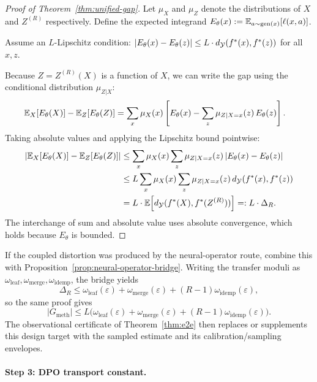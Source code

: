 \begin{proof}[Proof of Theorem~\ref{thm:unified-gap}]
Let $\mu_X$ and $\mu_Z$ denote the distributions of $X$ and $Z^{(R)}$ respectively. Define the expected integrand $E_\theta(x) := \mathbb{E}_{a \sim \mathrm{gen}(x)}[\ell(x, a)]$.

Assume an $L$-Lipschitz condition: $|E_\theta(x) - E_\theta(z)| \le L \cdot d_{\mathcal{Y}}(f^\ast(x), f^\ast(z))$ for all $x, z$.

Because $Z = Z^{(R)}(X)$ is a function of $X$, we can write the gap using the conditional distribution $\mu_{Z|X}$:
\begin{align*}
\mathbb{E}_X[E_\theta(X)] - \mathbb{E}_Z[E_\theta(Z)]
&= \sum_x \mu_X(x) \left[ E_\theta(x) - \sum_z \mu_{Z|X=x}(z)\, E_\theta(z) \right].
\end{align*}
Taking absolute values and applying the Lipschitz bound pointwise:
\begin{align*}
\left|\mathbb{E}_X[E_\theta(X)] - \mathbb{E}_Z[E_\theta(Z)]\right|
&\le \sum_x \mu_X(x) \sum_z \mu_{Z|X=x}(z)\, |E_\theta(x) - E_\theta(z)| \\
&\le L \sum_x \mu_X(x) \sum_z \mu_{Z|X=x}(z)\, d_{\mathcal{Y}}(f^\ast(x), f^\ast(z)) \\
&= L \cdot \mathbb{E}\!\left[d_{\mathcal{Y}}(f^\ast(X), f^\ast(Z^{(R)}))\right] =: L \cdot \Delta_R.
\end{align*}
The interchange of sum and absolute value uses absolute convergence, which holds because $E_\theta$ is bounded.
\end{proof}

\noindent If the coupled distortion was produced by the neural-operator route, combine this with Proposition~\ref{prop:neural-operator-bridge}. Writing the transfer moduli as $\omega_{\mathrm{leaf}},\omega_{\mathrm{merge}},\omega_{\mathrm{idemp}}$, the bridge yields
\[
\Delta_R
\le
\omega_{\mathrm{leaf}}(\varepsilon)
+\omega_{\mathrm{merge}}(\varepsilon)
+(R-1)\omega_{\mathrm{idemp}}(\varepsilon),
\]
so the same proof gives
\[
|G_{\mathrm{meth}}|
\le
L\Big(\omega_{\mathrm{leaf}}(\varepsilon)
+\omega_{\mathrm{merge}}(\varepsilon)
+(R-1)\omega_{\mathrm{idemp}}(\varepsilon)\Big).
\]
The observational certificate of Theorem~\ref{thm:e2e} then replaces or supplements this design target with the sampled estimate and its calibration/sampling envelopes.

\paragraph{Step 3: DPO transport constant.}

